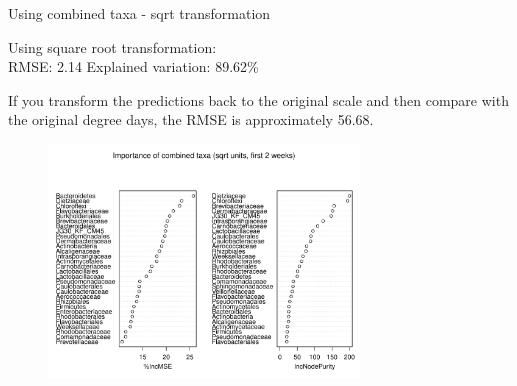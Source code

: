 \documentclass{beamer}
\begin{document}
\begin{frame}{Using combined taxa - sqrt transformation}
  
  {\scriptsize
    
  \noindent Using square root transformation:\\
  RMSE: 2.14  \hspace{0.05in}  Explained variation: 89.62\%

  \vspace{0.05in}
  
  \noindent If you transform the predictions back to the original
  scale and then compare with the original degree days, the RMSE is
  approximately 56.68.
  
\begin{center}
\begin{figure}
  \includegraphics[width=3.25in]{../all_together/first_two_weeks/sqrt_units_first_two_weeks_combined_imp_plot}
\end{figure}
\end{center}
\vspace{-0.25in}
}
  
\end{frame}
\end{document}
